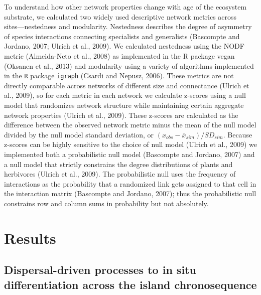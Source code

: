 To understand how other network properties change with age of the
ecosystem substrate, we calculated two widely used descriptive network
metrics across sites–--nestedness and modularity. Nestedness describes
the degree of asymmetry of species interactions connecting specialists
and generalists (Bascompte and Jordano, 2007; Ulrich et al., 2009). We
calculated nestedness using the NODF metric (Almeida-Neto et al.,
2008) as implemented in the R package vegan (Oksanen et al., 2013) and
modularity using a variety of algorithms implemented in the \texttt{R}
package \texttt{igraph} (Csardi and Nepusz, 2006). These metrics are not
directly comparable across networks of different size and connectance
(Ulrich et al., 2009), so for each metric in each network we calculate
z-scores using a null model that randomizes network structure while
maintaining certain aggregate network properties (Ulrich et al.,
2009). These z-scores are calculated as the difference between the
observed network metric minus the mean of the null model divided by
the null model standard deviation, or
$(x_{obs} − \bar{x}_{sim}) / SD_{sim}$. Because z-scores can be highly
sensitive to the choice of null model (Ulrich et al., 2009) we
implemented both a probabilistic null model (Bascompte and Jordano,
2007) and a null model that strictly constrains the degree
distributions of plants and herbivores (Ulrich et al., 2009). The
probabilistic null uses the frequency of interactions as the
probability that a randomized link gets assigned to that cell in the
interaction matrix (Bascompte and Jordano, 2007); thus the
probabilistic null constrains row and column sums in probability but
not absolutely.


\section{Results}

\subsection{Dispersal-driven processes to in situ differentiation
across the island chronosequence}

